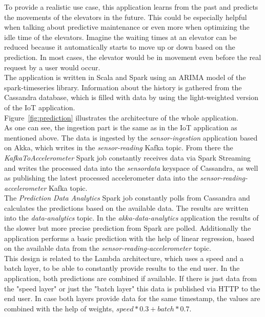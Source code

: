 To provide a realistic use case, this application learns from the past and predicts the movements of the elevators in the future.
This could be especially helpful when talking about predictive maintenance or even more when optimizing the idle time of the elevators.
Imagine the waiting times at an elevator can be reduced because it automatically starts to move up or down based on the prediction.
In most cases, the elevator would be in movement even before the real request by a user would occur.\\
The application is written in Scala and Spark using an ARIMA model of the spark-timeseries library.
Information about the history is gathered from the Cassandra database, which is filled with data by using the light-weighted version of the IoT application.\\

Figure~\ref{fig:prediction} illustrates the architecture of the whole application.\\
As one can see, the ingestion part is the same as in the IoT application as mentioned above.
The data is ingested by the \textit{sensor-ingestion} application based on Akka, which writes in the \textit{sensor-reading} Kafka topic.
From there the \textit{KafkaToAccelerometer} Spark job constantly receives data via Spark Streaming and writes the processed data into the \textit{sensordata} keyspace of Cassandra, as well as publishing the latest processed accelerometer data into the \textit{sensor-reading-accelerometer} Kafka topic.\\
The \textit{Prediction Data Analytics} Spark job constantly polls from Cassandra and calculates the predictions based on the available data.
The results are written into the \textit{data-analytics} topic.
In the \textit{akka-data-analytics} application the results of the slower but more precise prediction from Spark are polled.
Additionally the application performs a basic prediction with the help of linear regression, based on the available data from the \textit{sensor-reading-accelerometer} topic.\\
This design is related to the Lambda architecture, which uses a speed and a batch layer, to be able to constantly provide results to the end user.
In the application, both predictions are combined if available.
If there is just data from the "speed layer" or just the "batch layer" this data is published via HTTP to the end user.
In case both layers provide data for the same timestamp, the values are combined with the help of weights, ${speed} * 0.3 + {batch} * 0.7$.\\

